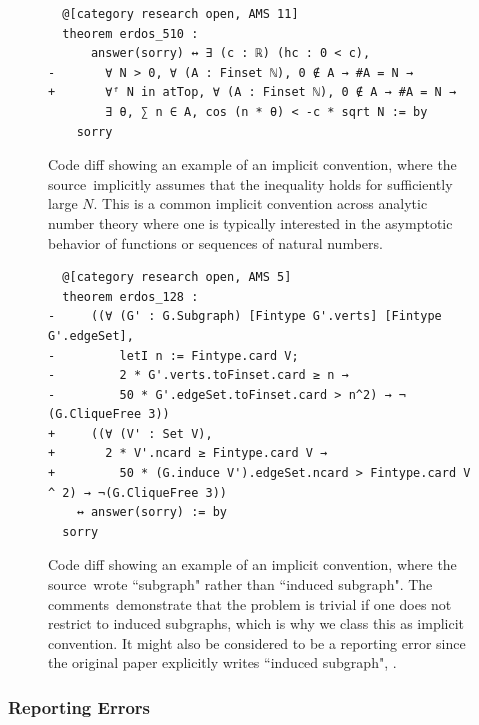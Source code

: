 \begin{figure}[h]
    \centering
    \begin{verbatim}
  @[category research open, AMS 11]
  theorem erdos_510 :
      answer(sorry) ↔ ∃ (c : ℝ) (hc : 0 < c),
-       ∀ N > 0, ∀ (A : Finset ℕ), 0 ∉ A → #A = N →
+       ∀ᶠ N in atTop, ∀ (A : Finset ℕ), 0 ∉ A → #A = N →
        ∃ θ, ∑ n ∈ A, cos (n * θ) < -c * sqrt N := by
    sorry
    \end{verbatim}
    \caption{Code diff showing an example of an implicit convention, where the source\protect\footnotemark\ implicitly assumes that the inequality holds for sufficiently large $N$. This is a common implicit convention across analytic number theory where one is typically interested in the asymptotic behavior of functions or sequences of natural numbers.}
    \label{fig:misform_implicit_asymptotic}
\end{figure}
\newpage
\begin{figure}[h]
    \centering
    \begin{verbatim}
  @[category research open, AMS 5]
  theorem erdos_128 :
-     ((∀ (G' : G.Subgraph) [Fintype G'.verts] [Fintype G'.edgeSet],
-         letI n := Fintype.card V;
-         2 * G'.verts.toFinset.card ≥ n →
-         50 * G'.edgeSet.toFinset.card > n^2) → ¬ (G.CliqueFree 3))
+     ((∀ (V' : Set V),
+       2 * V'.ncard ≥ Fintype.card V →
+         50 * (G.induce V').edgeSet.ncard > Fintype.card V ^ 2) → ¬(G.CliqueFree 3))
    ↔ answer(sorry) := by
  sorry
    \end{verbatim}
    \caption{Code diff showing an example of an implicit convention, where the source\protect\footnotemark\ wrote ``subgraph" rather than ``induced subgraph". The comments\protect\footnotemark\ demonstrate that the problem is trivial if one does not restrict to induced subgraphs, which is why we class this as implicit convention. It might also be considered to be a reporting error since the original paper explicitly writes ``induced subgraph", \cite[p. 344]{Erdos93}.}
    \label{fig:misform_implicit_induced}
\end{figure}
\addtocounter{footnote}{-1}
\addtocounter{footnote}{1}
 
\subsubsection{Reporting Errors}

